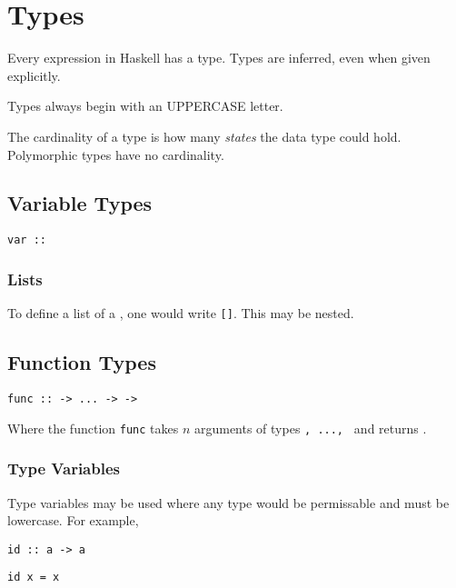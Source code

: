 \section{Types}

Every expression in Haskell has a type. Types are inferred, even when given explicitly.

Types always begin with an UPPERCASE letter.

The cardinality of a type is how many \textit{states} the data type could hold. Polymorphic types have no cardinality.

\subsection{Variable Types}

\begin{center}
  \texttt{var :: }
\end{center}

\subsubsection{Lists}

To define a list of a \texttt{}, one would write \texttt{[]}. This may be nested.

\subsection{Function Types}

\begin{center}
  \texttt{func ::  -> ... ->  -> }
\end{center}

Where the function \texttt{func} takes $n$ arguments of types \texttt{, ..., } and returns \texttt{}.

\subsubsection{Type Variables}

Type variables may be used where any type would be permissable and must be lowercase. For example,

\begin{center}
  \texttt{id :: a -> a}

  \texttt{id x = x}
\end{center}

